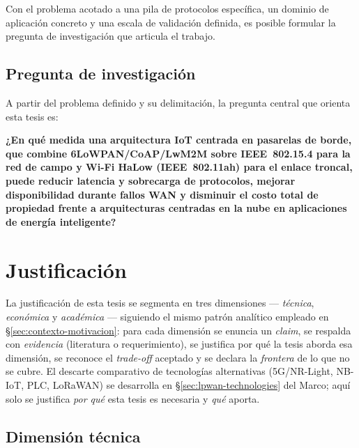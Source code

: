 Con el problema acotado a una pila de protocolos específica, un dominio de aplicación concreto y una escala de validación definida, es posible formular la pregunta de investigación que articula el trabajo.

\subsection{Pregunta de investigación}

A partir del problema definido y su delimitación, la pregunta central que orienta esta tesis es:

\textbf{¿En qué medida una arquitectura IoT centrada en pasarelas de borde, que combine 6LoWPAN/CoAP/LwM2M sobre IEEE~802.15.4 para la red de campo y Wi-Fi HaLow (IEEE~802.11ah) para el enlace troncal, puede reducir latencia y sobrecarga de protocolos, mejorar disponibilidad durante fallos WAN y disminuir el costo total de propiedad frente a arquitecturas centradas en la nube en aplicaciones de energía inteligente?}



\section{Justificación}
\label{sec:justificacion-investigacion}

La justificación de esta tesis se segmenta en tres dimensiones --- \emph{técnica}, \emph{económica} y \emph{académica} --- siguiendo el mismo patrón analítico empleado en §\ref{sec:contexto-motivacion}: para cada dimensión se enuncia un \emph{claim}, se respalda con \emph{evidencia} (literatura o requerimiento), se justifica por qué la tesis aborda esa dimensión, se reconoce el \emph{trade-off} aceptado y se declara la \emph{frontera} de lo que no se cubre. El descarte comparativo de tecnologías alternativas (5G/NR-Light, NB-IoT, PLC, LoRaWAN) se desarrolla en §\ref{sec:lpwan-technologies} del Marco; aquí solo se justifica \emph{por qué} esta tesis es necesaria y \emph{qué} aporta.

\subsection{Dimensión técnica}

